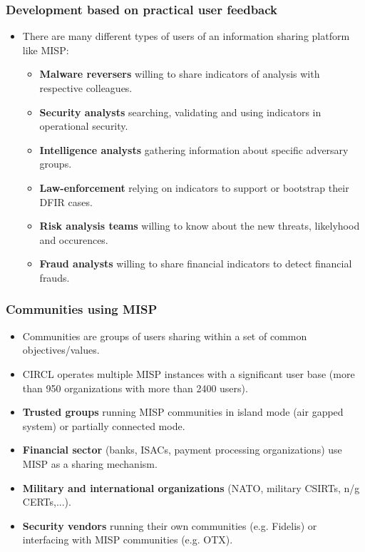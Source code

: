 \begin{frame}
\frametitle{Development based on practical user feedback}
\begin{itemize}
\item There are many different types of users of an information sharing platform like MISP:
        \begin{itemize}
                \item {\bf Malware reversers} willing to share indicators of analysis with respective colleagues.
                \item {\bf Security analysts} searching, validating and using indicators in operational security.
                \item {\bf Intelligence analysts} gathering information about specific adversary groups.
                \item {\bf Law-enforcement} relying on indicators to support or bootstrap their DFIR cases.
                \item {\bf Risk analysis teams} willing to know about the new threats, likelyhood and occurences.
                \item {\bf Fraud analysts} willing to share financial indicators to detect financial frauds.
        \end{itemize}
\end{itemize}
\end{frame}

\begin{frame}
 \frametitle{Communities using MISP}
 \begin{itemize}
	 \item Communities are groups of users sharing within a set of common objectives/values.
	 \item CIRCL operates multiple MISP instances with a significant user base (more than 950 organizations with more than 2400 users).
     \item {\bf Trusted groups} running MISP communities in island mode (air gapped system) or partially connected mode.
	 \item {\bf Financial sector} (banks, ISACs, payment processing organizations) use MISP as a sharing mechanism.
	 \item {\bf Military and international organizations} (NATO, military CSIRTs, n/g CERTs,...).
	 \item {\bf Security vendors} running their own communities (e.g. Fidelis) or interfacing with MISP communities (e.g. OTX).
 \end{itemize}
\end{frame}

